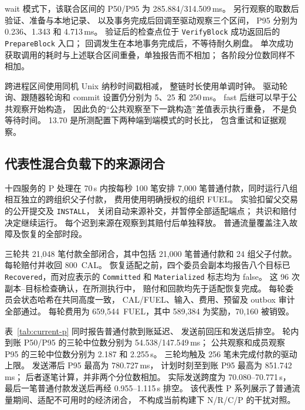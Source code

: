 wait 模式下，该联合区间的 P50/P95 为
285.884/314.509\,ms。
另行观察的取数后验证、准备与本地记录、
以及事务完成后回调至驱动观察三个区间，
P95 分别为 0.236、1.343 和 4.713\,ms。
验证后的检查点位于 \texttt{VerifyBlock} 成功返回后的
\texttt{PrepareBlock} 入口；
回调发生在本地事务完成后，不等待耐久刷盘。
单次成功获取调用的耗时与上述联合区间重叠，单独报告而不相加；
各阶段分位数同样不相加。

跨进程区间使用同机 Unix 纳秒时间戳相减，
整链时长使用单调时钟。
驱动轮询、跟随器轮询和 commit 设置仍分别为
5、25 和 250\,ms。
fast 后继可以早于公共观察开始构造，
因此负的“公共观察至下一跳构造”差值表示执行重叠，
不是负等待时间。
13.70 是所测配置下两种端到端模式的时长比，
包含重试和证据观察。

\subsection{代表性混合负载下的来源闭合}

十四服务的 P 处理在 70\,s 内按每秒 100 笔安排
7,000 笔普通付款，同时运行八组相互独立的跨组织父子付款，
费用使用明确授权的组织 FUEL。
实验扣留父交易的公开提交及 \texttt{INSTALL}，
关闭自动来源补交，并暂停全部适配端点；
共识和赔付决定继续运行。
每个迟到来源在观察到其赔付后单独释放。
普通流量覆盖注入故障及恢复的全部时段。

三轮共 21,048 笔付款全部闭合，其中包括
21,000 笔普通付款和 24 组父子付款。
每轮赔付并收回 800~CAL。
恢复适配之前，四个委员会副本均报告八个目标已
\texttt{Recovered}，而对应表示的
\texttt{Committed} 和 \texttt{Materialized} 标志均为 false。
这 96 次副本--目标检查确认，在所测执行中，
赔付和回款均先于适配恢复完成。
每轮委员会状态哈希在共同高度一致，
CAL/FUEL、输入、费用、预留及 outbox 审计全部通过。
每轮费用为 659,544~FUEL，其中
589,384 为奖励，70,160 被销毁。

表~\ref{tab:current-p} 同时报告普通付款到账延迟、
发送前回压和发送后排空。
轮内到账 P50/P95 的三轮中位数分别为
54.538/147.549\,ms；
公共观察和成员观察 P95 的三轮中位数分别为
2.187 和 2.255\,s。
三轮均触及 256 笔未完成付款的驱动上限。
发送滞后 P95 最高为 780.727\,ms，
计划时刻至到账 P95 最高为 851.742\,ms；
后者逐笔计算，并非两个分位数相加。
实际发送跨度为 70.080--70.771\,s，
最后一笔普通付款发送后再经 0.955--1.115\,s 排空。
该代表性 P 系列展示了普通流量期间、适配不可用时的经济闭合，
不构成当前构建下 N/R/C/P 的干扰对照。

